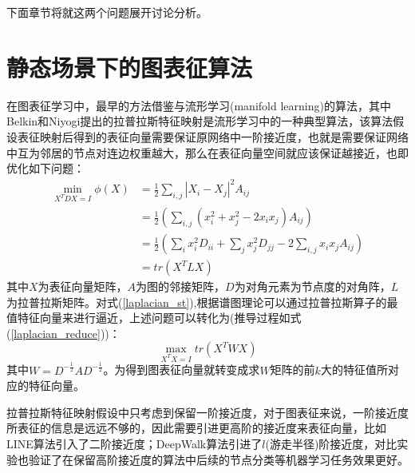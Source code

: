 下面章节将就这两个问题展开讨论分析。


\section{静态场景下的图表征算法}
在图表征学习中，最早的方法借鉴与流形学习(manifold learning)的算法，其中Belkin和Niyogi提出的拉普拉斯特征映射是流形学习中的一种典型算法，该算法假设表征映射后得到的表征向量需要保证原网络中一阶接近度，也就是需要保证网络中互为邻居的节点对连边权重越大，那么在表征向量空间就应该保证越接近，也即优化如下问题：
\begin{equation}\label{laplacian_st}
\begin{aligned}
\min_{X^TDX=I} \phi(X) &= \frac{1}{2}\sum_{i,j}|X_i - X_j|^2A_{ij} \\
&= \frac{1}{2}(\sum_{i,j}(x_i^2+x_j^2-2x_ix_j) A_{ij}) \\
&=\frac{1}{2} (\sum_ix_i^2D_{ii} +\sum_j x_j^2 D_{jj} - 2\sum_{i,j}x_i x_j A_{ij}) \\
&= tr(X^TLX)
\end{aligned}
\end{equation}
其中$X$为表征向量矩阵，$A$为图的邻接矩阵，$D$为对角元素为节点度的对角阵，$L$为拉普拉斯矩阵。对式(\ref{laplacian_st}),根据谱图理论\cite{chung1997spectral}可以通过拉普拉斯算子的最值特征向量来进行逼近，上述问题可以转化为(推导过程如式(\ref{laplacian_reduce}))：
\begin{equation}
\max_{X^TX = I} tr(X^TWX)
\end{equation}
其中$W = D^{-\frac{1}{2}}AD^{-\frac{1}{2}} $。为得到图表征向量就转变成求$W$矩阵的前$k$大的特征值所对应的特征向量。

拉普拉斯特征映射假设中只考虑到保留一阶接近度，对于图表征来说，一阶接近度所表征的信息是远远不够的，因此需要引进更高阶的接近度来表征向量，比如LINE算法引入了二阶接近度；DeepWalk算法引进了$l$(游走半径)阶接近度，对比实验也验证了在保留高阶接近度的算法中后续的节点分类等机器学习任务效果更好。

